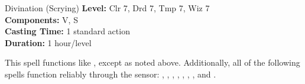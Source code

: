 {Divination (Scrying)}
{
	\textbf{Level:}
	Clr 7, Drd 7, Tmp 7, Wiz 7\\
	\textbf{Components:}
	V, S\\
	\textbf{Casting Time:}
	1 standard action\\
	\textbf{Duration:}
	1 hour/level\\
}
{
	This spell functions like , except as noted above. Additionally, all of the following spells function reliably through the sensor: , , , , , , , and .

}
